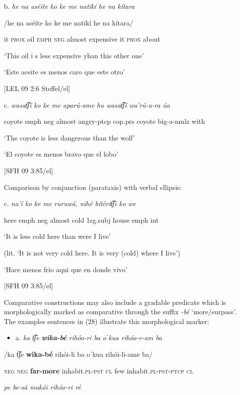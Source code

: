  b.  \textit{he    na  aséite    ko  ke  me    natikí    he  na  kítara}

/he  na   aséite    ko  ke  me    natikí    he  na  kítara/

it  \textsc{prox} oil \textsc{emph  neg} almost expensive  it  \textsc{prox} about 

‘This oil i  s less expensive yhan this other one’

‘Este aceite es menos caro que este otro’

[LEL 09 2:6 Steffel/el]

  c.  \textit{wasat͡ʃí  ko  ke  me    aparú-ame  hu    wasat͡ʃí  wa’rú-a-ra  úa}

   coyote  emph  neg  almost  angry-ptcp  cop.prs coyote  big-a-nmlz  with

    ‘The coyote is less dangerous than the wolf’

    ‘El coyote es menos bravo que el lobo’

    [SFH 09 3:85/el]

Comparison by conjunction (parataxis) with verbal ellipsis:

  c.  \textit{na’í  ko    ke  me    ruruwá,  nihé    bitérit͡ʃi  ko  we}

 here  emph    neg  almost  cold    1sg.subj  house  emph  int

    ‘It is less cold here than were I live’

    (lit. ‘It is not very cold here. It is very (cold) where I live’)

    ‘Hace menos frio aqui que en donde vivo’

  [SFH 09 3:85/el]

Comparative constructions may also include a gradable predicate which is morphologically marked as comparative through the suffix \textit{{}-bé} ‘more/surpass’. The examples sentences in (28) illustrate this morphological marker:

\begin{itemize}
\item a.   \textit{ka   t͡ʃe}   \textbf{\textit{wika-bé}} \textit{rihóo-ri   ba   oˈkua   rihóo-r-am     ba} 
\end{itemize}

/ka  t͡ʃe  \textbf{wika-bé}  rihói-li    ba  oˈkua  rihói-li-ame    ba/

  \textsc{neg  neg} \textbf{far-more}  inhabit.\textsc{pl-pst  cl} few  inhabit\textsc{.pl-pst-ptcp  cl}

\textit{pe   be-sá     makói   rihóo-ri   ré} 

